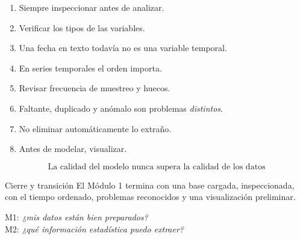 \begin{frame}
\begin{recordar}
\begin{enumerate}
  \item Siempre inspeccionar antes de analizar.
  \item Verificar los tipos de las variables.
  \item Una fecha en texto todavía no es una variable temporal.
  \item En series temporales el orden importa.
  \item Revisar frecuencia de muestreo y huecos.
  \item Faltante, duplicado y anómalo son problemas \emph{distintos}.
  \item No eliminar automáticamente lo extraño.
  \item Antes de modelar, visualizar.
\end{enumerate}
\end{recordar}
\vfill
\[
\boxed{\text{La calidad del modelo nunca supera la calidad de los datos}}
\]
\end{frame}

\begin{frame}{Cierre y transición}
El Módulo 1 termina con una base cargada, inspeccionada, con el tiempo ordenado,
problemas reconocidos y una visualización preliminar.
\vfill
\begin{center}
M1: \emph{¿mis datos están bien preparados?}\\[0.4em]
\fl\quad M2: \emph{¿qué información estadística puedo extraer?}
\end{center}
\end{frame}


